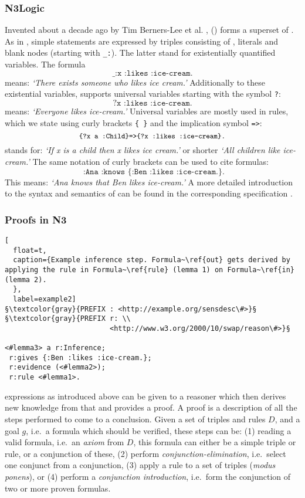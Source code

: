 \subsubsection{N3Logic}
Invented about a decade ago by Tim Berners-Lee et al. \cite{N3Logic},  
\nthreelogic (\nthree) forms a superset of \rdf \cite{rdf}. 
As in \rdf, 
simple \nthree statements are expressed by triples consisting of \uris, literals and blank nodes (starting with \texttt{\_:}). The latter stand for existentially 
quantified variables. The formula
\[
\texttt{\_:x :likes :ice-cream.}
\]
means: \textit{`There exists someone who likes ice cream.'} 
Additionally to these existential variables, \nthree supports universal variables starting with the symbol \texttt{?}: %
\[
\texttt{?x :likes :ice-cream.}
\]
means: \textit{`Everyone likes ice-cream.'} Universal variables are mostly used in rules, 
which 
we state
using curly brackets \texttt{\{ \}} and the implication symbol \texttt{=>}: %
\begin{equation}\label{rule}
\small
 \texttt{\{?x a :Child\}=>\{?x :likes :ice-cream\}.}
 \normalsize
\end{equation}
stands for: \textit{`If x is a child then x likes ice cream.'} or shorter \textit{`All children like ice-cream.'}
The same notation of curly brackets can be used to cite formulas:
\[
\texttt{ :Ana :knows \{:Ben :likes :ice-cream.\}.}
\]
This means: \textit{`Ana knows that Ben likes ice-cream.'}
A more detailed introduction to the syntax and  semantics of \nthree can be found in the corresponding specification \cite{Notation3}.

\subsubsection{Proofs in N3}\label{proof}
\begin{lstlisting}[
  float=t,
  caption={Example inference step. Formula~\ref{out} gets derived by applying the rule in Formula~\ref{rule} (lemma 1) on Formula~\ref{in} (lemma 2). 
  },
  label=example2]
§\textcolor{gray}{PREFIX : <http://example.org/sensdesc\#>}§
§\textcolor{gray}{PREFIX r: \\
                         <http://www.w3.org/2000/10/swap/reason\#>}§

<#lemma3> a r:Inference; 
 r:gives {:Ben :likes :ice-cream.}; 
 r:evidence (<#lemma2>);
 r:rule <#lemma1>.
\end{lstlisting}
\nthree expressions as introduced above can be given to a reasoner which then derives new knowledge from that
and provides 
a proof.
A proof is a description of all the steps  
performed to come to a conclusion. 
Given a set of triples and rules $D$, and a goal $g$, i.e.\ a formula which should be verified, 
these steps can be: (1) reading a valid formula, i.e.\ an \emph{axiom} from $D$, this formula can either be a simple triple or rule,
or a conjunction of these,
(2) perform \emph{conjunction-elimination}, i.e.\ select one conjunct from a conjunction, 
(3) apply a rule to a set of triples (\emph{modus ponens}), 
or (4)
perform a \emph{conjunction introduction}, i.e.\ form the conjunction of two or more proven formulas. 

